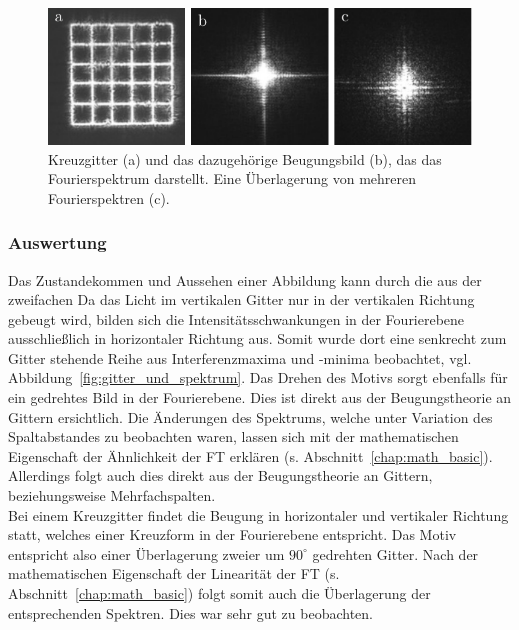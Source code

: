 \begin{figure}[ht]
	\centering
	\includegraphics{images/Regina/abb14.pdf}
	\caption[Kreuzgitter mit Fourierspektrum]{
		Kreuzgitter (a) und das dazugehörige Beugungsbild (b), das das Fourierspektrum darstellt. Eine Überlagerung von mehreren Fourierspektren (c).
	}
	\label{fig:kreuzgitter_und_spektrum}
\end{figure}



\subsubsection*{Auswertung}
Das Zustandekommen und Aussehen einer Abbildung kann durch die aus der zweifachen 
Da das Licht im vertikalen Gitter nur in der vertikalen Richtung gebeugt wird, bilden sich die Intensitätsschwankungen in der Fourierebene ausschließlich in horizontaler Richtung aus. Somit wurde dort eine senkrecht zum Gitter stehende Reihe aus Interferenzmaxima und -minima beobachtet, vgl. Abbildung~\ref{fig:gitter_und_spektrum}. Das Drehen des Motivs sorgt ebenfalls für ein gedrehtes Bild in der Fourierebene. Dies ist direkt aus der Beugungstheorie an Gittern ersichtlich. Die Änderungen des Spektrums, welche unter Variation des Spaltabstandes zu beobachten waren, lassen sich mit der mathematischen Eigenschaft der Ähnlichkeit der FT erklären (s. Abschnitt~\ref{chap:math_basic}). Allerdings folgt auch dies direkt aus der Beugungstheorie an Gittern, beziehungsweise Mehrfachspalten.\\

Bei einem Kreuzgitter findet die Beugung in horizontaler und vertikaler Richtung statt, welches einer Kreuzform in der Fourierebene entspricht. Das Motiv entspricht also einer Überlagerung zweier um $90^\circ$ gedrehten Gitter. Nach der mathematischen Eigenschaft der Linearität der FT (s. Abschnitt~\ref{chap:math_basic}) folgt somit auch die Überlagerung der entsprechenden Spektren. Dies war sehr gut zu beobachten.

